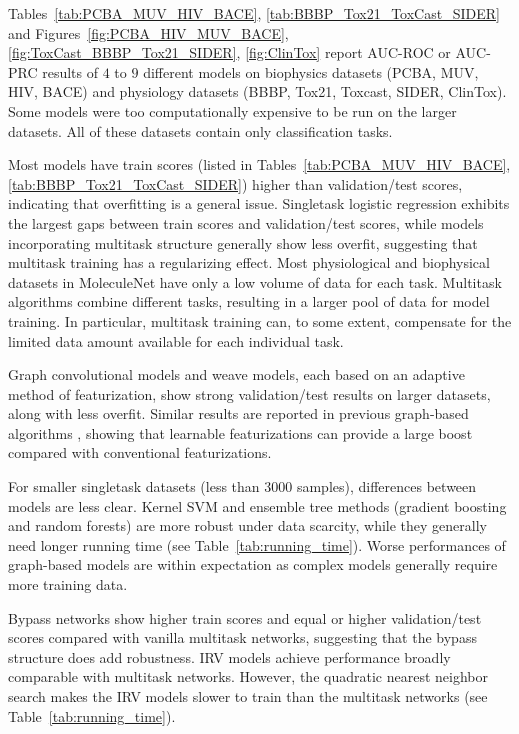 Tables~\ref{tab:PCBA_MUV_HIV_BACE}, \ref{tab:BBBP_Tox21_ToxCast_SIDER} and Figures~\ref{fig:PCBA_HIV_MUV_BACE}, \ref{fig:ToxCast_BBBP_Tox21_SIDER}, \ref{fig:ClinTox} report AUC-ROC or AUC-PRC results of $4$ to $9$ different models on biophysics datasets (PCBA, MUV, HIV, BACE) and physiology datasets (BBBP, Tox21, Toxcast, SIDER, ClinTox). Some models were too computationally expensive to be run on the larger datasets. All of these datasets contain only classification tasks. 

Most models have train scores (listed in Tables~\ref{tab:PCBA_MUV_HIV_BACE}, \ref{tab:BBBP_Tox21_ToxCast_SIDER}) higher than validation/test scores, indicating that overfitting is a general issue. Singletask logistic regression exhibits the largest gaps between train scores and validation/test scores, while models incorporating multitask structure generally show less overfit, suggesting that multitask training has a regularizing effect. Most physiological and biophysical datasets in MoleculeNet have only a low volume of data for each task. Multitask algorithms combine different tasks, resulting in a larger pool of data for model training. In particular, multitask training can, to some extent, compensate for the limited data amount available for each individual task.

Graph convolutional models and weave models, each based on an adaptive method of featurization\cite{graphconv_feat, kearnes2016graphconv}, show strong validation/test results on larger datasets, along with less overfit. Similar results are reported in previous graph-based algorithms \cite{kearnes2016graphconv, graphconv_feat, MPNN, schutt2016quantum, lusci2013deep}, showing that learnable featurizations can provide a large boost compared with conventional featurizations.

For smaller singletask datasets (less than 3000 samples), differences between models are less clear. Kernel SVM and ensemble tree methods (gradient boosting and random forests) are more robust under data scarcity, while they generally need longer running time (see Table~\ref{tab:running_time}). Worse performances of graph-based models are within expectation as complex models generally require more training data.

Bypass networks show higher train scores and equal or higher validation/test scores compared with vanilla multitask networks, suggesting that the bypass structure does add robustness. IRV models achieve performance broadly comparable with multitask networks. However, the quadratic nearest neighbor search makes the IRV models slower to train than the multitask networks (see Table~\ref{tab:running_time}).

